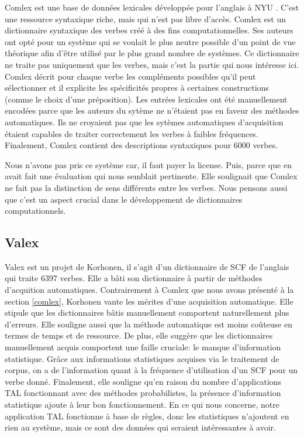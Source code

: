 Comlex est une base de données lexicales développée pour l'anglais à NYU \citep{Grishman:1994:CSB:991886.991931}. C'est une ressource syntaxique riche, mais qui n'est pas libre d'accès. Comlex est un dictionnaire syntaxique des verbes créé à des fins computationnelles. Ses auteurs ont opté pour un système qui se voulait le plus neutre possible d'un point de vue théorique afin d'être utilisé par le plus grand nombre de systèmes. Ce dictionnaire ne traite pas uniquement que les verbes, mais c'est la partie qui nous intéresse ici. Comlex décrit pour chaque verbe les compléments possibles qu'il peut sélectionner et il explicite les spécificités propres à certaines constructions (comme le choix d'une préposition). Les entrées lexicales ont été manuellement encodées parce que les auteurs du sytème ne n'étaient pas en faveur des méthodes automatiques. Ils ne croyaient pas que les sytèmes automatiques d'acquisition étaient capables de traiter correctement les verbes à faibles fréquences. Finalement, Comlex contient des descriptions syntaxiques pour 6000 verbes. 

Nous n'avons pas pris ce système car, il faut payer la license. Puis, parce que \cite{SchulerVerbnetBroadcoverageComprehensive2005} en avait fait une évaluation qui nous semblait pertinente. Elle soulignait que Comlex ne fait pas la distinction de sens différents entre les verbes. Nous pensons aussi que c'est un aspect crucial dans le développement de dictionnaires computationnels.

\subsection{Valex}
 
Valex est un projet de Korhonen, il s'agit d'un dictionnaire de \acf{SCF} de l'anglais \citep{Korhonenlargesubcategorizationlexicon2006} qui traite 6397 verbes. Elle a bâti son dictionnaire à partir de méthodes d'acquition automatiques. Contrairement à Comlex que nous avons présenté à la section \ref{comlex}, Korhonen vante les mérites d'une acquisition automatique. Elle stipule que les dictionnaires bâtis manuellement comportent naturellement plus d'erreurs. Elle souligne aussi que la méthode automatique est moins coûteuse en termes de temps et de ressource. De plus, elle suggère que les dictionnaires manuellement acquis comportent une faille cruciale: le manque d'information statistique. Grâce aux informations statistiques acquises via le traitement de corpus, on a de l'information quant à la fréquence d'utilisation d'un \ac{SCF} pour un verbe donné. Finalement, elle souligne qu'en raison du nombre d'applications \ac{TAL} fonctionnant avec des méthodes probabilistes, la présence d'information statistique ajoute à leur bon fonctionnement. En ce qui nous concerne, notre application \ac{TAL} fonctionne à base de règles, donc les statistiques n'ajoutent en rien au système, mais ce sont des données qui seraient intéressantes à avoir. 

